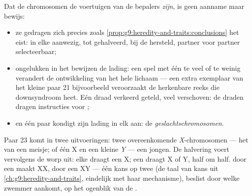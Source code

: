 \begin{proposition}\label{prop:g9:chromosomes:evidence}
Dat de chromosomen de voertuigen van de bepalers \emph{zijn},
is geen aanname maar bewijs:
\begin{itemize}
  \item ze gedragen zich precies zoals
        \cref{prop:g9:heredity-and-traits:conclusions} het
        eist: in elke  aanwezig, tot 
        gehalveerd, bij de  hersteld, partner voor
        partner selecteerbaar;
  \item ongelukken in het  bewijzen de lading: een
        spel met één  te veel of te weinig verandert
        de ontwikkeling van het hele lichaam --- een extra
        exemplaar van het kleine paar 21 bijvoorbeeld
        veroorzaakt de herkenbare reeks  die
        downsyndroom heet. Eén draad verkeerd geteld, veel
         verschoven: de draden dragen instructies
        voor ;
  \item en één paar kondigt zijn lading in elk  aan:
        de \emph{geslachtschromosomen}.
\end{itemize}
\end{proposition}
\admitted

\begin{definition}\label{def:g9:chromosomes:xy}
Paar 23 komt in twee uitvoeringen: twee overeenkomende
\emph{X}-chromosomen --- het  van een meisje; of één X
en een kleine \emph{Y} --- een jongen. De halvering voert
vervolgens de worp uit: elke  draagt een X; een 
draagt X of Y, half om half.  door een 
maakt XX, door een  XY --- één kans op twee (de taal
van kans uit \cref{ch:g9:heredity-and-traits}, eindelijk met
haar mechanisme), beslist door welke zwemmer aankomt, op het
ogenblik van de .
\end{definition}

